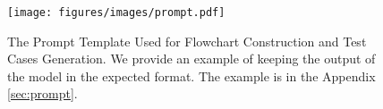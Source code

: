 \begin{figure}[t] \centering
    \texttt{[image: figures/images/prompt.pdf]}
    \caption{The Prompt Template Used for Flowchart Construction and Test Cases Generation. We provide an example of keeping the output of the model in the expected format. The example is in the Appendix \ref{sec:prompt}.} \label{fig:prompt}
\end{figure}